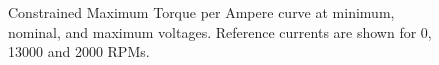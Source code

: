 \begin{figure}[!htb]
	\begin{subfigmatrix}{2}
	\end{subfigmatrix}
	\begin{subfigmatrix}{1}
	\end{subfigmatrix}
	\caption{Constrained Maximum Torque per Ampere curve at minimum, nominal, and maximum voltages. Reference currents are shown for 0, 13000 and 2000 RPMs.}
	\label{fig:mtpa_constrained}%
\end{figure}

